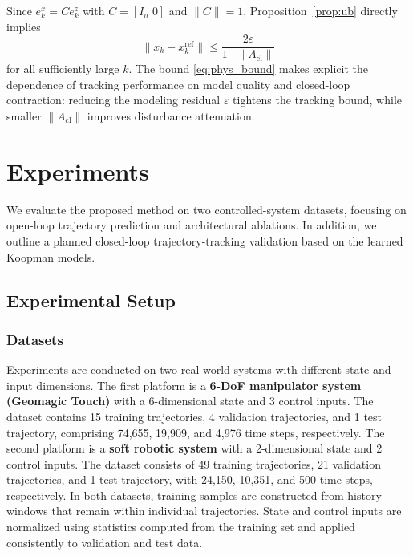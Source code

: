 \documentclass[journal]{IEEEtran}
\begin{document}
Since $e_k^x = C e_k^z$ with $C=[I_n\;0]$ and $\|C\|=1$, Proposition~\ref{prop:ub} directly implies
\begin{equation}
    \|x_k - x_k^{\mathrm{ref}}\|
    \leq
    \frac{2\varepsilon}{1 - \|A_{\mathrm{cl}}\|}
    \label{eq:phys_bound}
\end{equation}
for all sufficiently large $k$. The bound \eqref{eq:phys_bound} makes explicit the dependence of tracking performance on model quality and closed-loop contraction: reducing the modeling residual $\varepsilon$ tightens the tracking bound, while smaller $\|A_{\mathrm{cl}}\|$ improves disturbance attenuation.

\section{Experiments}
\label{sec:experiments}

We evaluate the proposed method on two controlled-system datasets, focusing on open-loop trajectory prediction and architectural ablations. In addition, we outline a planned closed-loop trajectory-tracking validation based on the learned Koopman models.

\subsection{Experimental Setup}

\subsubsection{Datasets}

Experiments are conducted on two real-world systems with different state and input dimensions. The first platform is a \textbf{6-DoF manipulator system (Geomagic Touch)} with a 6-dimensional state and 3 control inputs. The dataset contains 15 training trajectories, 4 validation trajectories, and 1 test trajectory, comprising 74,655, 19,909, and 4,976 time steps, respectively. The second platform is a \textbf{soft robotic system} with a 2-dimensional state and 2 control inputs. The dataset consists of 49 training trajectories, 21 validation trajectories, and 1 test trajectory, with 24,150, 10,351, and 500 time steps, respectively. In both datasets, training samples are constructed from history windows that remain within individual trajectories. State and control inputs are normalized using statistics computed from the training set and applied consistently to validation and test data.
\end{document}
